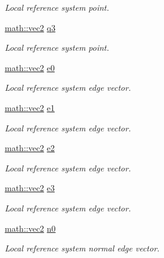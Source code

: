 \begin{DoxyCompactItemize}
\begin{DoxyCompactList}\small\item\em Local reference system point. \end{DoxyCompactList}\item 
\hyperlink{structphysim_1_1math_1_1vec2}{math\+::vec2} \hyperlink{classphysim_1_1geometry_1_1rectangle_a91d5944425f33226a5cbb25d92e2e156}{q3}
\begin{DoxyCompactList}\small\item\em Local reference system point. \end{DoxyCompactList}\item 
\hyperlink{structphysim_1_1math_1_1vec2}{math\+::vec2} \hyperlink{classphysim_1_1geometry_1_1rectangle_a44c4dbc41d09ca3a2825419dd4b9a84e}{e0}
\begin{DoxyCompactList}\small\item\em Local reference system edge vector. \end{DoxyCompactList}\item 
\hyperlink{structphysim_1_1math_1_1vec2}{math\+::vec2} \hyperlink{classphysim_1_1geometry_1_1rectangle_a2cf9abe7981c380a6611908735846078}{e1}
\begin{DoxyCompactList}\small\item\em Local reference system edge vector. \end{DoxyCompactList}\item 
\hyperlink{structphysim_1_1math_1_1vec2}{math\+::vec2} \hyperlink{classphysim_1_1geometry_1_1rectangle_afb0095ec1886e7f8e85b69d995c07d2d}{e2}
\begin{DoxyCompactList}\small\item\em Local reference system edge vector. \end{DoxyCompactList}\item 
\hyperlink{structphysim_1_1math_1_1vec2}{math\+::vec2} \hyperlink{classphysim_1_1geometry_1_1rectangle_ae9bfe69927c3a5fc6e70f4610d7e1245}{e3}
\begin{DoxyCompactList}\small\item\em Local reference system edge vector. \end{DoxyCompactList}\item 
\hyperlink{structphysim_1_1math_1_1vec2}{math\+::vec2} \hyperlink{classphysim_1_1geometry_1_1rectangle_a37851b1a45bde03b343f65e3ed48615c}{n0}
\begin{DoxyCompactList}\small\item\em Local reference system normal edge vector. \end{DoxyCompactList}\item 

\end{DoxyCompactItemize}
